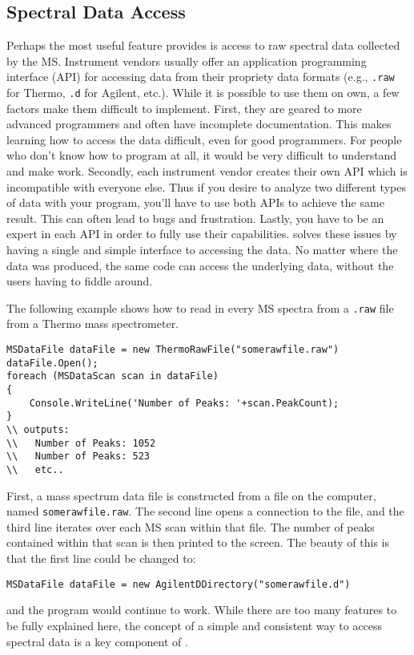 \subsection*{Spectral Data Access}
Perhaps the most useful feature \csmsl{} provides is access to raw spectral data collected by the MS. Instrument vendors usually offer an application programming interface (API) for accessing data from their propriety data formats (e.g., \texttt{.raw} for Thermo, \texttt{.d} for Agilent, etc.). While it is possible to use them on own, a few factors make them difficult to implement. First, they are geared to more advanced programmers and often have incomplete documentation. This makes learning how to access the data difficult, even for good programmers. For people who don't know how to program at all, it would be very difficult to understand and make work. Secondly, each instrument vendor creates their own API which is incompatible with everyone else. Thus if you desire to analyze two different types of data with your program, you'll have to use both APIs to achieve the same result. This can often lead to bugs and frustration. Lastly, you have to be an expert in each API in order to fully use their capabilities. \csmsl{} solves these issues by having a single and simple interface to accessing the data. No matter where the data was produced, the same code can access the underlying data, without the users having to fiddle around. 

The following example shows how to read in every MS spectra from a \texttt{.raw} file from a Thermo mass spectrometer.
\begin{lstlisting}
MSDataFile dataFile = new ThermoRawFile("somerawfile.raw")
dataFile.Open();                   
foreach (MSDataScan scan in dataFile)
{             
    Console.WriteLine('Number of Peaks: '+scan.PeakCount);
}
\\ outputs:
\\   Number of Peaks: 1052
\\   Number of Peaks: 523
\\   etc..
\end{lstlisting}
First, a mass spectrum data file is constructed from a file on the computer, named \texttt{somerawfile.raw}. The second line opens a connection to the file, and the third line iterates over each MS scan within that file. The number of peaks contained within that scan is then printed to the screen. The beauty of this is that the first line could be changed to:
\begin{lstlisting}
MSDataFile dataFile = new AgilentDDirectory("somerawfile.d")
\end{lstlisting}
and the program would continue to work. While there are too many features to be fully explained here, the concept of a simple and consistent way to access spectral data is a key component of \csmsl{}. 


